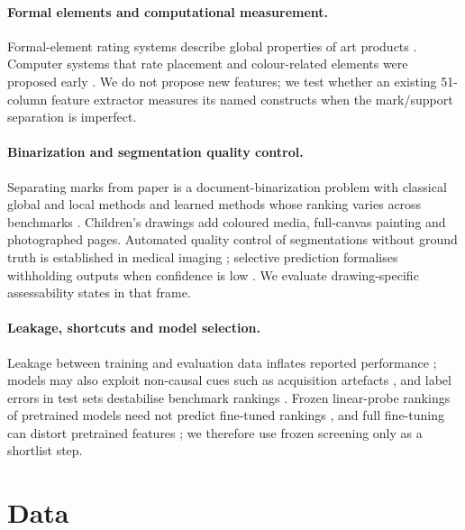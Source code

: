 \documentclass[pdflatex,sn-mathphys-num]{sn-jnl}
\begin{document}
\paragraph{Formal elements and computational measurement.} Formal-element rating systems describe global properties of art products \cite{gantt2001feats}. Computer systems that rate placement and colour-related elements were proposed early \cite{kim2007placement,kim2007colour}. We do not propose new features; we test whether an existing 51-column feature extractor measures its named constructs when the mark/support separation is imperfect.

\paragraph{Binarization and segmentation quality control.} Separating marks from paper is a document-binarization problem with classical global and local methods \cite{otsu1979threshold,niblack1986introduction,sauvola2000adaptive} and learned methods whose ranking varies across benchmarks \cite{sukesh2024fair}. Children's drawings add coloured media, full-canvas painting and photographed pages. Automated quality control of segmentations without ground truth is established in medical imaging \cite{robinson2019qc}; selective prediction formalises withholding outputs when confidence is low \cite{geifman2017selective}. We evaluate drawing-specific assessability states in that frame.

\paragraph{Leakage, shortcuts and model selection.} Leakage between training and evaluation data inflates reported performance \cite{kapoor2023leakage}; models may also exploit non-causal cues such as acquisition artefacts \cite{geirhos2020shortcut}, and label errors in test sets destabilise benchmark rankings \cite{northcutt2021pervasive}. Frozen linear-probe rankings of pretrained models need not predict fine-tuned rankings \cite{kornblith2019better}, and full fine-tuning can distort pretrained features \cite{kumar2022finetuning}; we therefore use frozen screening only as a shortlist step.

\section{Data}\label{sec:data}
\end{document}
